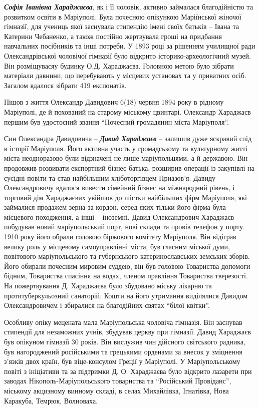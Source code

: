 
\textbf{\emph{Софія Іванівна Хараджаєва}}, як і її чоловік, активно займалася благодійністю та
розвитком освіти в Маріуполі. Була почесною опікункою Маріїнської жіночої
гімназії, для учениць якої заснувала стипендію імені своїх батьків – Івана та
Катерини Чебаненко, а також постійно жертвувала гроші на придбання навчальних
посібників та інші потреби. У 1893 році за рішенням училищної ради
Олександрівської чоловічої гімназії було відкрито історико-археологічний музей.
Він розміщувасяу будинку О.Д. Хараджаєва. Головною метою було зібрати матеріали
давнини, що перебувають у місцевих установах та у приватних осіб. Загалом
вдалося зібрати 419 експонатів.

Пішов з життя Олександр Давидович 6(18) червня 1894 року в рідному Маріуполі,
де й похований на старому міському цвинтарі. Олександр Хараджаєв першим був
удостоєний звання \enquote{Почесний громадянин міста Маріуполя}. 

Син Олександра Давидовича – \emph{\textbf{Давид Хараджаєв}} – залишив дуже яскравий слід в
історії Маріуполя. Його активна участь у громадському та культурному житті
міста неодноразово були відзначені не лише маріупольцями, а й державою. Він
продовжив розвивати експортний бізнес батька, розширив операції із закупівлі на
сусідні повіти та став найбільшим хліботоргівцем Приазов’я. Давиду
Олександровичу вдалося вивести сімейний бізнес на міжнародний рівень, і
торговий дім Хараджаєвих увійшов до шістки найбільших фірм Маріуполя, які
займалися продажем зерна за кордон, серед яких тільки його фірма була місцевого
походження, а інші – іноземні. Давид Олександрович Хараджаєв побудував новий
маріупольський порт, нові склади та провів телефон у порту. 1910 року його
обрали головою біржового комітету Маріуполя. Він відіграв велику роль у
місцевому самоуправлінні міста, був гласним міської думи, повітового
маріупольського та губернського катеринославських земських зборів. Його обирали
почесним мировим суддею, він був головою Товариства допомоги бідним, Товариства
спасіння на водах, членом правління Товариства тверезості. На пожертвування Д.
Хараджаєва було збудовано міську лікарню та протитуберкульозний санаторій.
Кошти на його утримання виділялися Давидом Олександровичем і збиралися на
благодійних святах \enquote{білої квітки}.

Особливу опіку мецената мала Маріупольська чоловіча гімназія. Він заснував
стипендії для незаможних учнів, збудував  церкву при гімназії. Давид Хараджаєв
був опікуном гімназії 30 років. Він вислужив чин дійсного світського радника,
був нагороджений російськими та грецькими орденами за внесок у зміцнення
з'язків двох країн, був віце-консулом Греції у Маріуполі. У Маріупольському
повіті з ініціативи та за підтримки Д. О. Хараджаєва було відкрито лазарети при
заводах Нікополь-Маріупольського товариства та \enquote{Російський Провіданс}, міському
акцизному винному складі, в селах Михайлівка, Ігнатівка, Нова Каракуба, Темрюк,
Волноваха.

